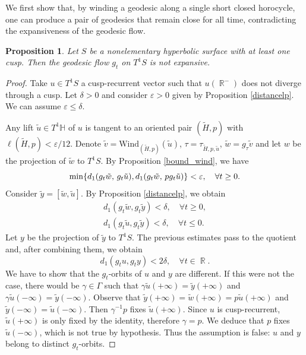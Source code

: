 \documentclass[a4paper,english,reqno]{amsart}
\DeclareMathOperator{\reals}{\mathbb{R}}
\renewcommand{\H}{\mathbb{H}}
\newtheorem{proposition}{Proposition}
\theoremstyle{definition}
\numberwithin{equation}{section}
\begin{document}
We first show that, by winding a geodesic along a single short closed horocycle, one can produce a pair of geodesics that remain close for all time, contradicting the expansiveness of the geodesic flow.
\begin{proposition}\label{nonexpansiveness}
	Let $S$ be a nonelementary hyperbolic surface with at least one cusp. Then the geodesic flow $g_t$ on $T^1 S$ is not expansive.
\end{proposition}
	\begin{proof}
		Take $u\in T^1S$ a cusp-recurrent vector such that $u(\reals^-)$ does not diverge through a cusp. Let $\delta>0$ and consider $\varepsilon>0$ given by Proposition \ref{distancelp}. We can assume $\varepsilon\le \delta$. 
		
		Any lift $\tilde u\in T^1 \H$ of $u$ is tangent to an oriented pair $(\tilde H, p)$ with $\ell (\tilde H, p)<\varepsilon/12$. Denote $\tilde v = \mathrm{Wind}_{(\tilde H, p )}(\tilde u)$, $\tau =\tau_{\tilde H, p ,\tilde u}$, $\tilde w = g_{\tau} \tilde v$ and let $w$ be the projection of $\tilde w$ to $T^1S$. By Proposition \ref{bound_wind}, we have 
		\[
		\min \{ d_1 (g_{t} \tilde w ,\, g_t\tilde u ),
		d_1(g_{t} \tilde w,\, p g_t\tilde u)
		\}
		\\ < \varepsilon, \quad \forall t\ge 0.
		\]
		Consider $\tilde y=[\tilde w , \tilde u]$. By Proposition \ref{distancelp}, we obtain
		\begin{align*}
			d_1(g_t \tilde w , g_t \tilde y ) <\delta, \quad \forall t\ge 0 ,\\
			d_1(g_t \tilde u , g_t \tilde y ) <\delta, \quad \forall t\le 0 . 
		\end{align*}
		Let $y$ be the projection of $\tilde y$ to $T^1S$. The previous estimates pass to the quotient and, after combining them, we obtain
		\[
		d_1(g_t u, g_t y) < 2\delta,\quad \forall t\in \reals.
		\]
		We have to show that the $g_t$-orbits of $u$ and $y$ are different. If this were not the case, there would be $\gamma\in \Gamma$ such that $\gamma \tilde u(+\infty) = \tilde y(+\infty )$ and $\gamma \tilde u(-\infty) = \tilde y(-\infty )$. Observe that $\tilde y (+\infty ) =\tilde w (+\infty ) = p \tilde u (+\infty)$ and $ \tilde y (-\infty)= \tilde u (-\infty)$. Then $\gamma^{-1} p $ fixes $\tilde u (+\infty)$. Since $u$ is cusp-recurrent, $\tilde u (+\infty)$ is only fixed by the identity, therefore $\gamma=p$. We deduce that $p$ fixes $\tilde u(-\infty)$, which is not true by hypothesis. Thus the assumption is false: $u$ and $y$ belong to distinct $g_t$-orbits.
		\end{proof}
\end{document}
